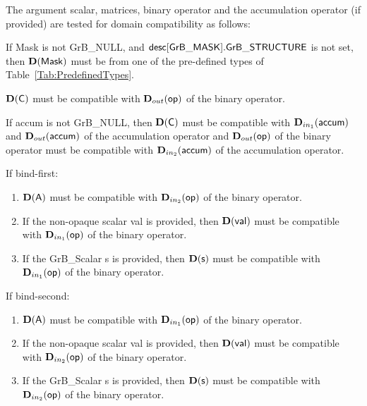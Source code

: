 The argument scalar, matrices, binary operator and the accumulation 
operator (if provided) are tested for domain compatibility as follows:
\begin{enumerate}
	\item If {\sf Mask} is not {\sf GrB\_NULL}, and ${\sf desc[GrB\_MASK].GrB\_STRUCTURE}$
    is not set, then $\bold{D}({\sf Mask})$ must be from one of the pre-defined types of 
    Table~\ref{Tab:PredefinedTypes}.

	\item $\bold{D}({\sf C})$ must be
    compatible with $\mbox{$\mathbf{D}_{out}$}({\sf op})$ of the binary operator. 

	\item If {\sf accum} is not {\sf GrB\_NULL}, then $\bold{D}({\sf C})$ must be
    compatible with $\mbox{$\mathbf{D}_{in_{1}}$}({\sf accum})$ and $\mbox{$\mathbf{D}_{out}$}({\sf accum})$ of the accumulation operator and 
    $\mbox{$\mathbf{D}_{out}$}({\sf op})$ of the binary operator must be compatible with $\mbox{$\mathbf{D}_{in_{2}}$}({\sf accum})$ of the accumulation operator.

{\color{red}
	\item If bind-first:
	    \begin{enumerate}

		\item $\bold{D}({\sf A})$ must be compatible with $\mbox{$\mathbf{D}_{in_{2}}$}({\sf op})$ of the binary operator.
	    
		\item If the non-opaque scalar {\sf val} is provided, then $\bold{D}({\sf val})$ must be compatible with $\mbox{$\mathbf{D}_{in_{1}}$}({\sf op})$ of the binary operator.

		\item If the {\sf GrB\_Scalar} {\sf s} is provided, then $\bold{D}({\sf s})$ must be compatible with $\mbox{$\mathbf{D}_{in_{1}}$}({\sf op})$ of the binary operator.

	    \end{enumerate}

	\item If bind-second:
	    \begin{enumerate}

		\item $\bold{D}({\sf A})$ must be compatible with $\mbox{$\mathbf{D}_{in_{1}}$}({\sf op})$ of the binary operator.
	    
		\item If the non-opaque scalar {\sf val} is provided, then $\bold{D}({\sf val})$ must be compatible with $\mbox{$\mathbf{D}_{in_{2}}$}({\sf op})$ of the binary operator.

		\item If the {\sf GrB\_Scalar} {\sf s} is provided, then $\bold{D}({\sf s})$ must be compatible with $\mbox{$\mathbf{D}_{in_{2}}$}({\sf op})$ of the binary operator.

	    \end{enumerate}
}
\end{enumerate}
